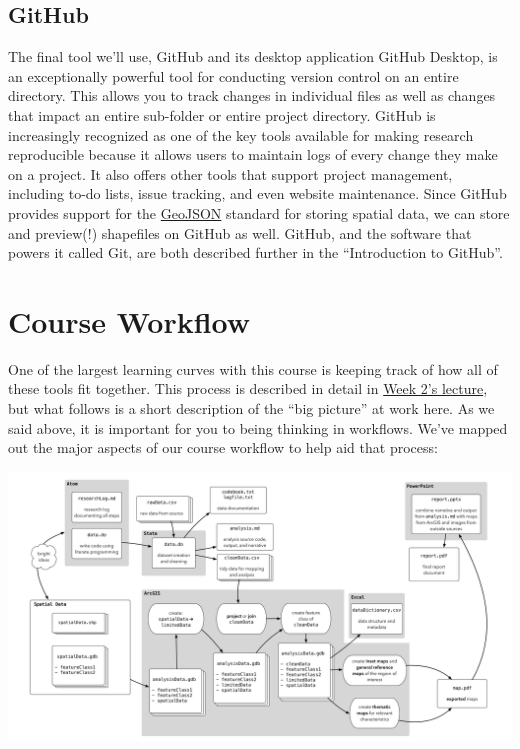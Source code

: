 \documentclass[]{book}
\begin{document}
\subsection{GitHub}\label{github}

The final tool we'll use, GitHub and its desktop application GitHub
Desktop, is an exceptionally powerful tool for conducting version
control on an entire directory. This allows you to track changes in
individual files as well as changes that impact an entire sub-folder or
entire project directory. GitHub is increasingly recognized as one of
the key tools available for making research reproducible because it
allows users to maintain logs of every change they make on a project. It
also offers other tools that support project management, including to-do
lists, issue tracking, and even website maintenance. Since GitHub
provides support for the \href{http://geojson.org}{GeoJSON} standard for
storing spatial data, we can store and preview(!) shapefiles on GitHub
as well. GitHub, and the software that powers it called Git, are both
described further in the ``Introduction to GitHub''.

\section{Course Workflow}\label{course-workflow}

One of the largest learning curves with this course is keeping track of
how all of these tools fit together. This process is described in detail
in \href{https://github.com/slu-soc5650/week-02}{Week 2's lecture}, but
what follows is a short description of the ``big picture'' at work here.
As we said above, it is important for you to being thinking in
workflows. We've mapped out the major aspects of our course workflow to
help aid that process:

\includegraphics[width=1\linewidth]{images/gisFlow1}
\end{document}

